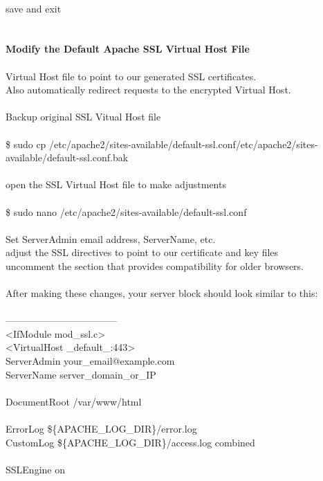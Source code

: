 \documentclass[10pt,a4paper]{article}
\begin{document}
{{{{{{{{{{{{{{{{{{\\
save and exit\\
\\
\\
\textbf{Modify the Default Apache SSL Virtual Host File}}{\large \\
\\
Virtual Host file to point to our generated SSL certificates.\\
Also automatically redirect requests to the encrypted Virtual Host.\\
\\
Backup original SSL Vitual Host file\\
\\
\$ sudo cp /etc/apache2/sites-available/default-ssl.conf}{\large /etc/apache2/sites-available/default-ssl.conf.bak}{\large \\
\\
open the SSL Virtual Host file to make adjustments\\
\\
\$ sudo nano /etc/apache2/sites-available/default-ssl.conf}{\large \\
\\
Set ServerAdmin email address, ServerName, etc.\\
adjust the SSL directives to point to our certificate and key files\\
uncomment the section that provides compatibility for older browsers.\\
\\
After making these changes, your server block should look similar to this:\\
\\
-----------------------------------\\
<IfModule mod\_ssl.c>\\
        <VirtualHost \_default\_:443>\\
                ServerAdmin your\_email@example.com}{\large \\
                ServerName server\_domain\_or\_IP\\
\\
                DocumentRoot /var/www/html}{\large \\
\\
                ErrorLog \$\{APACHE\_LOG\_DIR\}/error.log\\
                CustomLog \$\{APACHE\_LOG\_DIR\}/access.log combined\\
\\
                SSLEngine on\\
}}}}}}}}}}}}}}}}}}
\end{document}
